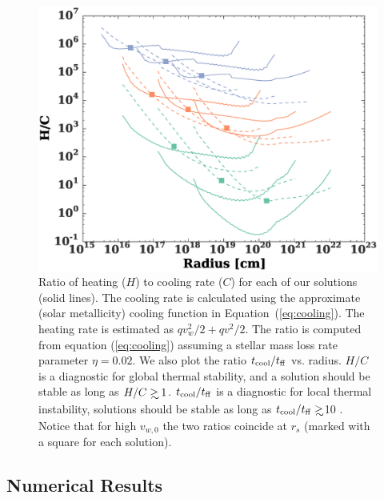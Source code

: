 \documentclass[usenatbib,fleqn]{mn2e}
\newcommand\gsim{\mathrel{\rlap{\lower4pt\hbox{\hskip1pt$\sim$}}
    \raise1pt\hbox{$>$}}}
\newcommand{\rs}{r_s}
\newcommand{\vw}{v_w}
\newcommand{\vwO}{v_{w,0}}
\newcommand{\tcool}{t_{\rm cool}}
\newcommand{\tff}{t_{\rm ff}}
\begin{document}
\begin{figure}
  \includegraphics[width=\columnwidth]{cooling.eps}
  \caption{\label{fig:cooling} Ratio of heating ($H$) to cooling rate
    ($C$) for each of our solutions (solid lines). The cooling rate is
    calculated using the approximate (solar metallicity) cooling
    function in Equation~(\ref{eq:cooling}). The heating rate is
    estimated as $q \vw^2/2+q v^2/2$. The ratio is computed from
    equation (\ref{eq:cooling}) assuming a stellar mass loss rate
    parameter $\eta=0.02$. We also plot the ratio $\tcool/\tff$
    vs. radius. $H/C$ is a diagnostic for global thermal stability,
    and a solution should be stable as long as
    $H/C\gsim1$. $\tcool/\tff$ is a diagnostic for local thermal
    instability, solutions should be stable as long as $\tcool/t_{\rm
      ff}\gsim$10 \citealt{McCourt+12}. Notice that for high $\vwO$
    the two ratios coincide at $\rs$ (marked with a square for each
    solution).}
\end{figure}


%


\subsection{Numerical Results}
\label{sec:numerical}
\end{document}
